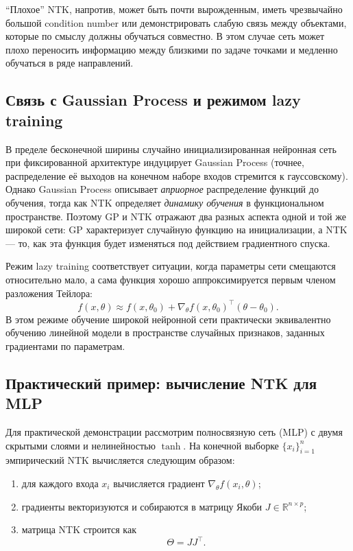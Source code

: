 ``Плохое'' NTK, напротив, может быть почти вырожденным, иметь чрезвычайно большой condition number или демонстрировать слабую связь между объектами, которые по смыслу должны обучаться совместно. В этом случае сеть может плохо переносить информацию между близкими по задаче точками и медленно обучаться в ряде направлений.

\subsection{Связь с Gaussian Process и режимом lazy training}

В пределе бесконечной ширины случайно инициализированная нейронная сеть при фиксированной архитектуре индуцирует Gaussian Process (точнее, распределение её выходов на конечном наборе входов стремится к гауссовскому). Однако Gaussian Process описывает \emph{априорное} распределение функций до обучения, тогда как NTK определяет \emph{динамику обучения} в функциональном пространстве. Поэтому GP и NTK отражают два разных аспекта одной и той же широкой сети: GP характеризует случайную функцию на инициализации, а NTK --- то, как эта функция будет изменяться под действием градиентного спуска.

Режим lazy training соответствует ситуации, когда параметры сети смещаются относительно мало, а сама функция хорошо аппроксимируется первым членом разложения Тейлора:
\begin{equation}
    f(x,\theta)\approx f(x,\theta_0)+\nabla_{\theta}f(x,\theta_0)^{\top}(\theta-\theta_0).
\end{equation}
В этом режиме обучение широкой нейронной сети практически эквивалентно обучению линейной модели в пространстве случайных признаков, заданных градиентами по параметрам.

\subsection{Практический пример: вычисление NTK для MLP}

Для практической демонстрации рассмотрим полносвязную сеть (MLP) с двумя скрытыми слоями и нелинейностью $\tanh$. На конечной выборке $\{x_i\}_{i=1}^{n}$ эмпирический NTK вычисляется следующим образом:
\begin{enumerate}
    \item для каждого входа $x_i$ вычисляется градиент $\nabla_{\theta} f(x_i,\theta)$;
    \item градиенты векторизуются и собираются в матрицу Якоби $J \in \mathbb{R}^{n \times p}$;
    \item матрица NTK строится как
    \begin{equation}
        \Theta = J J^{\top}.
    \end{equation}
\end{enumerate}


